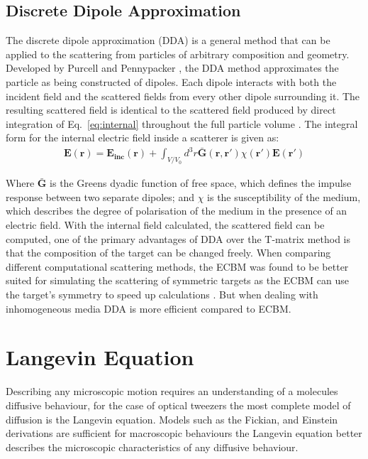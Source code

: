 \subsection{Discrete Dipole Approximation}
The discrete dipole approximation (DDA) is a general method that can 
be applied to the scattering from particles of arbitrary composition
and geometry. Developed by Purcell and Pennypacker \cite{Purcell1973}, 
the DDA method approximates the particle as being constructed of dipoles.
Each dipole interacts with both the incident field and the scattered fields
from every other dipole surrounding it. The resulting scattered field is 
identical to the scattered field produced by direct integration of 
Eq.~\eqref{eq:internal} throughout the full particle volume \cite{Goedecke1988}.
The integral form for the internal electric field inside a scatterer is 
given as:
\begin{align}
	\mathbf{E(r)} = \mathbf{E_{inc}(r)} + \int_{V/V_0}d^3r\mathbf{\bar{G}(r,r')}
	\chi(\mathbf{r'})\mathbf{E(r')}
\end{align}

Where $\mathbf{\bar{G}}$ is the Greens dyadic function of free space, which
defines the impulse response between two separate dipoles; and $\chi$ is the 
susceptibility of the medium, which describes the degree of polarisation of
the medium in the presence of an electric field. With the internal field 
calculated, the scattered field can be computed, one of the primary advantages
of DDA over the T-matrix method is that the composition of the target can 
be changed freely. When comparing different computational scattering methods,
the ECBM was found to be better suited for simulating the scattering of symmetric
targets as the ECBM can use the target's symmetry to speed up calculations \cite{Wriedt1998}. But when dealing with inhomogeneous media DDA is 
more efficient compared to ECBM. 

\section{Langevin Equation}
Describing any microscopic motion requires an understanding of a molecules
diffusive behaviour, for the case of optical tweezers the most complete model 
of diffusion is the Langevin equation. Models such as the Fickian, and Einstein 
derivations are sufficient for macroscopic behaviours the Langevin equation 
better describes the microscopic characteristics of any diffusive behaviour.
 
